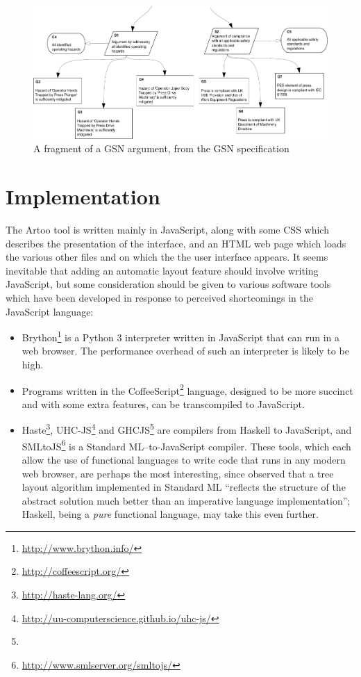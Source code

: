 \begin{figure}
    \includegraphics[width=\textwidth]{graphics/unaligned_siblings.pdf}
    \caption{A fragment of a GSN argument,
            from the GSN specification \citep[figure~42, section~2.3.6.5, pp.~34]{gsnstandard}}
    \label{fig:unalignedsiblings}
\end{figure}



\section{Implementation}

The Artoo tool is written mainly in JavaScript, along with some CSS which describes the presentation of the interface, and an HTML web page which loads the various other files and on which the the user interface appears. It seems inevitable that adding an automatic layout feature should involve writing JavaScript, but some consideration should be given to various software tools which have been developed in response to perceived shortcomings in the JavaScript language:

\begin{itemize}

\item Brython\footnote{\url{http://www.brython.info/}} is a Python 3 interpreter written in JavaScript that can run in a web browser. The performance overhead of such an interpreter is likely to be high.

\item Programs written in the CoffeeScript\footnote{\url{http://coffeescript.org/}} language, designed to be more succinct and with some extra features, can be transcompiled to JavaScript.

\item Haste\footnote{\url{http://haste-lang.org/}}, UHC-JS\footnote{\url{http://uu-computerscience.github.io/uhc-js/}}
and GHCJS\footnote{} are compilers from Haskell to JavaScript, and
SMLtoJS\footnote{\url{http://www.smlserver.org/smltojs/}} is a Standard ML--to-JavaScript compiler.
These tools, which each allow the use of functional languages to write code that runs in any modern web browser, are perhaps the most interesting, since \citet{kennedyfuntrees} observed that a tree layout algorithm implemented in Standard ML ``reflects the structure of the abstract solution much better than an imperative language implementation''; Haskell, being a \emph{pure} functional language, may take this even further.

\end{itemize}

